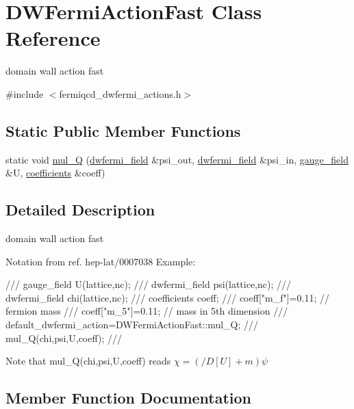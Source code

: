 \hypertarget{class_d_w_fermi_action_fast}{}\section{D\+W\+Fermi\+Action\+Fast Class Reference}
\label{class_d_w_fermi_action_fast}


domain wall action fast  




{\ttfamily \#include $<$fermiqcd\+\_\+dwfermi\+\_\+actions.\+h$>$}

\subsection*{Static Public Member Functions}
\begin{DoxyCompactItemize}
\item 
static void \hyperlink{class_d_w_fermi_action_fast_a52079bb2144dc7ef2f61c4916f9569ca}{mul\+\_\+Q} (\hyperlink{classdwfermi__field}{dwfermi\+\_\+field} \&psi\+\_\+out, \hyperlink{classdwfermi__field}{dwfermi\+\_\+field} \&psi\+\_\+in, \hyperlink{classgauge__field}{gauge\+\_\+field} \&U, \hyperlink{classcoefficients}{coefficients} \&coeff)
\end{DoxyCompactItemize}


\subsection{Detailed Description}
domain wall action fast 

Notation from ref. hep-\/lat/0007038 Example\+: \begin{DoxyVerb}/// gauge_field U(lattice,nc);
/// dwfermi_field psi(lattice,nc);
/// dwfermi_field chi(lattice,nc);
/// coefficients coeff;
/// coeff["m_f"]=0.11; // fermion mass
/// coeff["m_5"]=0.11; // mass in 5th dimension
/// default_dwfermi_action=DWFermiActionFast::mul_Q;
/// mul_Q(chi,psi,U,coeff);
/// \end{DoxyVerb}
 Note that mul\+\_\+\+Q(chi,psi,\+U,coeff) reads $ \chi=(/\!\!\!D[U]+m)\psi $ 

\subsection{Member Function Documentation}
\mbox{\label{class_d_w_fermi_action_fast_a52079bb2144dc7ef2f61c4916f9569ca}} 
